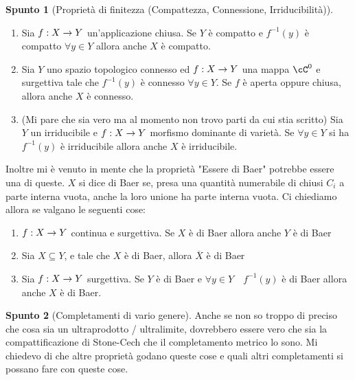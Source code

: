 \documentclass[a4paper,NoNotes,GeneralMath]{stdmdoc}
\theoremstyle{definition}
\newtheorem{spunto}{Spunto}
\begin{document}
\begin{spunto}[Proprietà di finitezza (Compattezza, Connessione, Irriducibilità)]
\begin{enumerate}
\begin{itemize}
				\end{itemize}
				\hrule
			\item Sia $f: X \rightarrow Y$ un'applicazione chiusa. Se $Y$ è compatto e $f^{-1}(y)$ è compatto $\forall y \in Y$ allora anche $X$ è compatto.
			\item Sia $Y$ uno spazio topologico connesso ed $f: X \rightarrow Y$ una mappa $\cC^0$ e surgettiva tale che $f^{-1}(y)$ è connesso $\forall y \in Y$. Se $f$ è aperta oppure chiusa, allora anche $X$ è connesso.
			\item (Mi pare che sia vero ma al momento non trovo parti da cui stia scritto) Sia $Y$ un irriducibile e $f: X \rightarrow Y$ morfismo dominante di varietà. Se $\forall y \in Y$ si ha $f^{-1}(y)$ è irriducibile allora anche $X$ è irriducibile.
		\end{enumerate}
		Inoltre mi è venuto in mente che la proprietà "Essere di Baer" potrebbe essere una di queste. $X$ si dice di Baer se, presa una quantità numerabile di chiusi $C_i$ a parte interna vuota, anche la loro unione ha parte interna vuota. Ci chiediamo allora se valgano le seguenti cose:
		\begin{enumerate}
			\item $f: X \rightarrow Y$ continua e surgettiva. Se $X$ è di Baer allora anche $Y$ è di Baer
			\item Sia $X \subseteq Y$, e tale che $X$ è di Baer, allora $\overline{X}$ è di Baer
			\item Sia $f: X \rightarrow Y$ surgettiva. Se $Y$ è di Baer e $\forall y \in Y \quad f^{-1}(y)$ è di Baer allora anche $X$ è di Baer.
		\end{enumerate}
	\end{spunto}
	
	\begin{spunto}[Completamenti di vario genere]
		Anche se non so troppo di preciso che cosa sia un ultraprodotto / ultralimite, dovrebbero essere vero che sia la compattificazione di Stone-Cech che il completamento metrico lo sono. Mi chiedevo di che altre proprietà godano queste cose e quali altri completamenti si possano fare con queste cose.
	\end{spunto}
	
	
\end{document}
